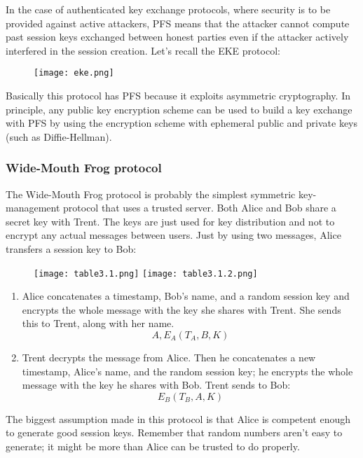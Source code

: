 \documentclass{article}
\begin{document}
In the case of authenticated key exchange protocols, where security is to be provided against active attackers, PFS means that the attacker cannot compute past session keys exchanged between honest parties even if the attacker actively interfered in the session creation.
Let's recall the EKE protocol:
\begin{figure} [H]
    \centering
    \texttt{[image: eke.png]}
\end{figure}
Basically this protocol has PFS because it exploits asymmetric cryptography.
In principle, any public key encryption scheme can be used to build a key exchange with PFS by using the encryption scheme with ephemeral public and private keys (such as Diffie-Hellman). 

\subsubsection{Wide-Mouth Frog protocol}
The Wide-Mouth Frog protocol is probably the simplest symmetric
key-management protocol that uses a trusted server. Both Alice and Bob share
a secret key with Trent. The keys are just used for key distribution and not to
encrypt any actual messages between users. Just by using two messages, Alice
transfers a session key to Bob:
\begin{figure} [H]
    \centering
    \texttt{[image: table3.1.png]}
    \texttt{[image: table3.1.2.png]}
\end{figure}
\begin{enumerate}
    \item Alice concatenates a timestamp, Bob’s name, and a random session
key and encrypts the whole message with the key she shares with Trent.
She sends this to Trent, along with her name.
\begin{equation*}
    A, E_A(T_A, B, K)
\end{equation*}
\item Trent decrypts the message from Alice. Then he concatenates a new
timestamp, Alice’s name, and the random session key; he encrypts the
whole message with the key he shares with Bob. Trent sends to Bob:
\begin{equation*}
    E_B(T_B, A, K)
\end{equation*}
\end{enumerate}
The biggest assumption made in this protocol is that Alice is competent
enough to generate good session keys. Remember that random numbers aren’t
easy to generate; it might be more than Alice can be trusted to do properly.
\end{document}
